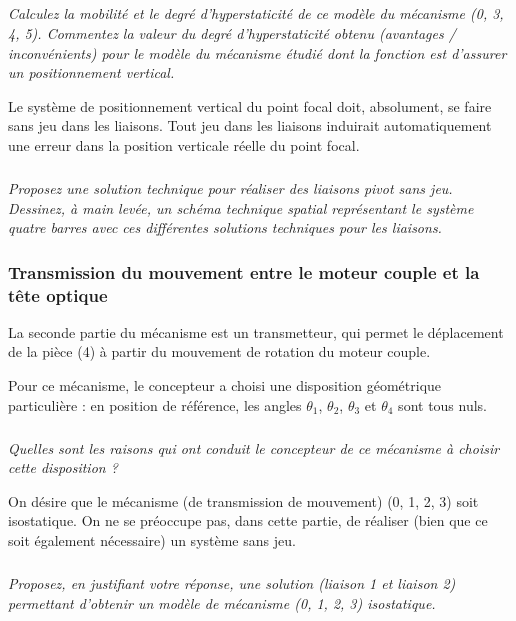 \subparagraph{\label{q_17}}\textit{Calculez la mobilité et le degré d’hyperstaticité de ce modèle du mécanisme (0, 3, 4, 5).
Commentez la valeur du degré d’hyperstaticité obtenu (avantages / inconvénients) pour le modèle du
mécanisme étudié dont la fonction est d’assurer un positionnement vertical.}
\ifprof
\begin{corrige}
\end{corrige}
\else
\fi

Le système de positionnement vertical du point focal doit, absolument, se faire sans jeu dans les liaisons.
Tout jeu dans les liaisons induirait automatiquement une erreur dans la position verticale réelle du point
focal.

\subparagraph{\label{q_18}}\textit{Proposez une solution technique pour réaliser des liaisons pivot sans jeu.
Dessinez, à main levée, un schéma technique spatial représentant le système quatre barres avec ces
différentes solutions techniques pour les liaisons.}
\ifprof
\begin{corrige}
\end{corrige}
\else
\fi

\subsubsection{Transmission du mouvement entre le moteur couple et la tête optique}
La seconde partie du mécanisme est un transmetteur, qui permet le déplacement de la pièce (4) à partir du
mouvement de rotation du moteur couple.

Pour ce mécanisme, le concepteur a choisi une disposition géométrique particulière : en position de
référence, les angles $\theta_1$, $\theta_2$, $\theta_3$ et $\theta_4$ sont tous nuls.


\subparagraph{\label{q_19}}\textit{Quelles sont les raisons qui ont conduit le concepteur de ce mécanisme à choisir cette disposition ?}
\ifprof
\begin{corrige}
\end{corrige}
\else
\fi

On désire que le mécanisme (de transmission de mouvement) (0, 1, 2, 3) soit isostatique. On ne se
préoccupe pas, dans cette partie, de réaliser (bien que ce soit également nécessaire) un système sans jeu.

\subparagraph{\label{q_20}}\textit{Proposez, en justifiant votre réponse, une solution (liaison 1 et liaison 2) permettant d’obtenir un
modèle de mécanisme (0, 1, 2, 3) isostatique.}
\ifprof
\begin{corrige}
\end{corrige}
\else
\fi